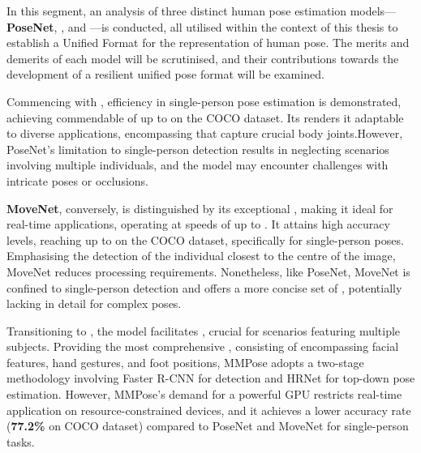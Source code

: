 
\page
In this segment, an analysis of three distinct human pose estimation models—{\bf PoseNet}, , and —is conducted, all utilised within the context of this thesis to establish a Unified Format for the representation of human pose. The merits and demerits of each model will be scrutinised, and their contributions towards the development of a resilient unified pose format will be examined.

Commencing with , efficiency in single-person pose estimation is demonstrated, achieving commendable  of up to  on the COCO dataset. Its  renders it adaptable to diverse applications, encompassing  that capture crucial body joints.\break However, PoseNet's limitation to single-person detection results in neglecting scenarios involving multiple individuals, and the model may encounter challenges with intricate poses or occlusions.

{\bf MoveNet}, conversely, is distinguished by its exceptional , making it ideal for real-time applications, operating at speeds of up to . It attains high accuracy levels, reaching up to  on the COCO dataset, specifically for single-person poses. Emphasising the detection of the individual closest to the centre of the image, MoveNet reduces processing requirements. Nonetheless, like PoseNet, MoveNet is confined to single-person detection and offers a more concise set of , potentially lacking in detail for complex poses.

Transitioning to , the model facilitates , crucial for scenarios featuring multiple subjects. Providing the most comprehensive , consisting of  encompassing facial features, hand gestures, and foot positions, MMPose adopts a two-stage methodology involving Faster R-CNN for detection and HRNet for top-down pose estimation. However, MMPose's demand for a powerful GPU restricts real-time application on resource-constrained devices, and it achieves a lower accuracy rate ({\bf 77.2\%} on COCO dataset) compared to PoseNet and MoveNet for single-person tasks.

